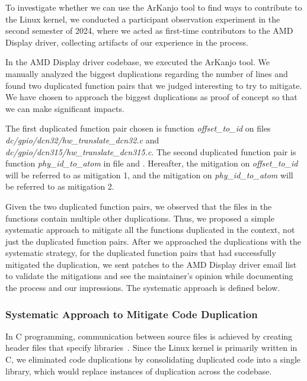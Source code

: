 To investigate whether we can use the ArKanjo tool to find ways to contribute to the 
Linux kernel, we conducted a participant observation experiment in the second semester 
of 2024, where we acted as first-time contributors to the AMD Display driver, collecting 
artifacts of our experience in the process.

In the AMD Display driver codebase, we executed the ArKanjo tool. 
We manually analyzed the biggest duplications regarding the number of lines and found 
two duplicated function pairs that we judged interesting to try to mitigate. We 
have chosen to approach the biggest duplications as proof of concept so that we 
can make significant impacts. 

The first duplicated function pair chosen is function \textit{offset\_to\_id} on files \textit{dc/gpio/dcn32/hw\_translate\_dcn32.c} and \textit{dc/gpio/dcn315/hw\_translate\_dcn315.c}. The second duplicated function pair is function \textit{phy\_id\_to\_atom} in file 
\textit{ } and \textit{}.
Hereafter, the mitigation on \textit{offset\_to\_id} will be referred to as mitigation 1, and the mitigation on 
\textit{phy\_id\_to\_atom} will be referred to as mitigation 2.

Given the two duplicated function pairs, we observed that the files in the functions 
contain multiple other duplications. Thus, we proposed a simple systematic approach 
to mitigate all the functions duplicated in the context, not just the duplicated 
function pairs. 
After we approached the duplications with the systematic strategy, for the duplicated 
function pairs that had successfully mitigated the duplication, we sent patches to the 
AMD Display driver email list to validate the mitigations and see the maintainer's opinion 
while documenting the process and our impressions.
The systematic approach is defined below. 

\subsubsection{Systematic Approach to Mitigate Code Duplication}
\label{subsubsec:systematic}

In C programming, communication between source files is achieved by creating header files that specify 
libraries~\cite{Cbook}. Since the Linux kernel is primarily written in C, we eliminated code duplications by consolidating duplicated code into a single library, which would replace instances of 
duplication across the codebase.

